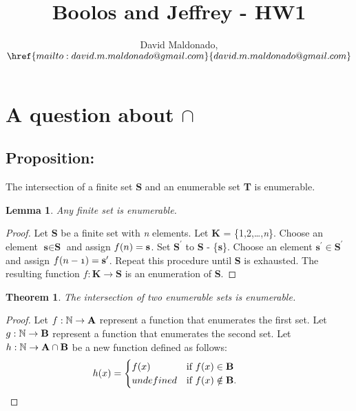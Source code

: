 \documentclass[a4paper,11pt]{article}
\author{David Maldonado, $\href{mailto:david.m.maldonado@gmail.com}%
{david.m.maldonado@gmail.com}$}
\title{Boolos and Jeffrey - HW1}
\newtheorem{lem}{Lemma}[section]
\newtheorem{thm}{Theorem}[section]
\begin{document}
\maketitle

\bigskip


\section{A question about $\cap$} 

	\subsection*{Proposition:}
	The intersection of a finite set \textbf{S} and an enumerable set \textbf{T} is enumerable.
	
	\bigskip

	\begin{lem}Any finite set is enumerable.\end{lem}
		\begin{proof}
		Let \textbf{S} be a finite set with \textit{n} elements. Let \textbf{K} = \{1,2,\dots,\textit{n}\}. 
		Choose an element $\textbf{s} \in \textbf{S}$ and assign $\mathnormal{f(n)} = \textbf{s}$. 
		Set $\textbf{S}^\prime$ to \textbf{S} - \{\textbf{s}\}. Choose an element $\textbf{s}^\prime
		\in \textbf{S}^\prime$ and assign $\mathnormal{f(n-1)} = \textbf{s}^\prime$. 
		Repeat this procedure until \textbf{S} is exhausted. The resulting function $f : \textbf{K} \rightarrow 	
		\textbf{S}$ is an enumeration of \textbf{S}.
		\end{proof}
		
		\bigskip
		
	\begin{thm}The intersection of two enumerable sets is enumerable.\end{thm}
		\begin{proof}
		Let $\mathnormal{f}: \mathbb{N} \rightarrow \textbf{A}$ represent a function that enumerates the 	first set. Let $\mathnormal{g}: \mathbb{N} \rightarrow \textbf{B}$ 
		represent a function that enumerates the second set. Let $\mathnormal{h}: \mathbb{N} \rightarrow 
		\textbf{A} \cap \textbf{B}$ be a new function defined as follows: 
		\bigskip
		\begin{equation*} \hspace*{-1cm}  h(x) = \begin{cases} f(x) &\mbox{if } f(x) \in \textbf{B} \\ 
		undefined & \mbox{if } f(x) \notin \textbf{B}. \end{cases} \end{equation*}
		\end{proof}
		
\end{document}
